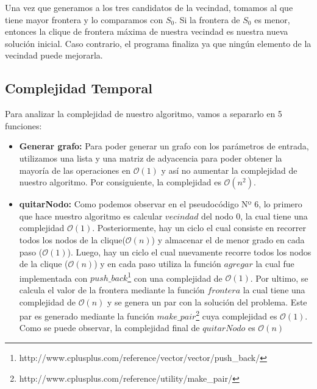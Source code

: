 Una vez que generamos a los tres candidatos de la vecindad, tomamos al que tiene mayor frontera y lo comparamos con $S_{0}$. Si la frontera de $S_{0}$ es menor, entonces la clique de frontera máxima de nuestra vecindad es nuestra nueva solución inicial. Caso contrario, el programa finaliza ya que ningún elemento de la vecindad puede mejorarla.

\subsection{Complejidad Temporal}
Para analizar la complejidad de nuestro algoritmo, vamos a separarlo en 5 funciones:
\begin{itemize}
\item \textbf{Generar grafo:} \newline
Para poder generar un grafo con los parámetros de entrada, utilizamos una lista y una matriz de adyacencia para poder obtener la mayoría de las operaciones en $\mathcal{O}(1)$ y así no aumentar la complejidad de nuestro algoritmo. Por consiguiente, la complejidad es $\mathcal{O}(n^{2})$.

\item \textbf{quitarNodo:} \newline
Como podemos observar en el pseudocódigo Nº 6, lo primero que hace nuestro algoritmo es calcular $vecindad$ del nodo 0, la cual tiene una complejidad $\mathcal{O}(1)$. Posteriormente, hay un ciclo el cual consiste en recorrer todos los nodos de la clique($\mathcal{O}(n)$) y almacenar el de menor grado en cada paso ($\mathcal{O}(1)$).
\newline
Luego, hay un ciclo el cual nuevamente recorre todos los nodos de la clique ($\mathcal{O}(n)$) y en cada paso utiliza la función $agregar$ la cual fue implementada con $push\_back$\footnote{http://www.cplusplus.com/reference/vector/vector/push\_back/} con una complejidad de $\mathcal{O}(1)$.
\newline
Por ultimo, se calcula el valor de la frontera mediante la función $frontera$ la cual tiene una complejidad de $\mathcal{O}(n)$ y se genera un par con la solución del problema. Este par es generado mediante la función $make\_pair$\footnote{http://www.cplusplus.com/reference/utility/make\_pair/} cuya complejidad es $\mathcal{O}(1)$.
\newline
Como se puede observar, la complejidad final de $quitarNodo$ es $\mathcal{O}(n)$


\end{itemize}
